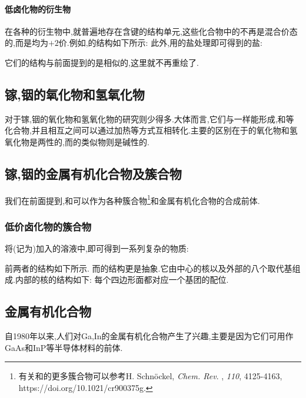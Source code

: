 \documentclass{ctexart}
\begin{document}
\paragraph{低卤化物的衍生物}
在各种的衍生物中,就普遍地存在含键的结构单元,这些化合物中的不再是混合价态的,而是均为$+2$价.例如,的结构如下所示:
此外,用的盐处理即可得到的盐:
\begin{center}
\end{center}
它们的结构与前面提到的是相似的,这里就不再重绘了.
\subsection{镓,铟的氧化物和氢氧化物}
对于镓,铟的氧化物和氢氧化物的研究则少得多.大体而言,它们与一样能形成,和等化合物,并且相互之间可以通过加热等方式互相转化.主要的区别在于的氧化物和氢氧化物是两性的,而的类似物则是碱性的.
\subsection{镓,铟的金属有机化合物及簇合物}
我们在前面提到,和可以作为各种簇合物\footnote{有关和的更多簇合物可以参考H. Schnöckel, \textit{Chem. Rev}. , \textit{110}, 4125-4163, https://doi.org/10.1021/cr900375g.}和金属有机化合物的合成前体.
\subsubsection{低价卤化物的簇合物}
将(记为)加入的溶液中,即可得到一系列复杂的物质:
\begin{center}
\end{center}
前两者的结构如下所示.
\noindent 而的结构更是抽象.它由中心的核以及外部的八个取代基组成.内部的核的结构如下:
\noindent 每个四边形面都对应一个基团的配位.
\subsection{金属有机化合物}
自1980年以来,人们对Ga,In的金属有机化合物产生了兴趣,主要是因为它们可用作GaAs和InP等半导体材料的前体.
\end{document}

